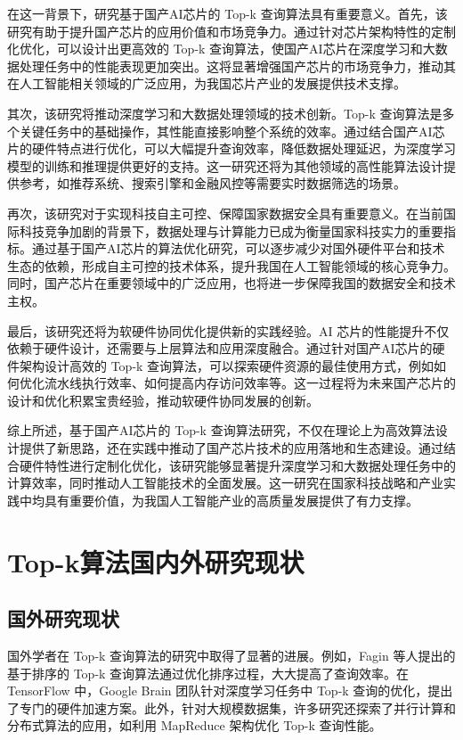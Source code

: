 在这一背景下，研究基于国产AI芯片的 Top-k 查询算法具有重要意义。首先，该研究有助于提升国产芯片的应用价值和市场竞争力。通过针对芯片架构特性的定制化优化，可以设计出更高效的 Top-k 查询算法，使国产AI芯片在深度学习和大数据处理任务中的性能表现更加突出。这将显著增强国产芯片的市场竞争力，推动其在人工智能相关领域的广泛应用，为我国芯片产业的发展提供技术支撑。

其次，该研究将推动深度学习和大数据处理领域的技术创新。Top-k 查询算法是多个关键任务中的基础操作，其性能直接影响整个系统的效率。通过结合国产AI芯片的硬件特点进行优化，可以大幅提升查询效率，降低数据处理延迟，为深度学习模型的训练和推理提供更好的支持。这一研究还将为其他领域的高性能算法设计提供参考，如推荐系统、搜索引擎和金融风控等需要实时数据筛选的场景。

再次，该研究对于实现科技自主可控、保障国家数据安全具有重要意义。在当前国际科技竞争加剧的背景下，数据处理与计算能力已成为衡量国家科技实力的重要指标。通过基于国产AI芯片的算法优化研究，可以逐步减少对国外硬件平台和技术生态的依赖，形成自主可控的技术体系，提升我国在人工智能领域的核心竞争力。同时，国产芯片在重要领域中的广泛应用，也将进一步保障我国的数据安全和技术主权。

最后，该研究还将为软硬件协同优化提供新的实践经验。AI 芯片的性能提升不仅依赖于硬件设计，还需要与上层算法和应用深度融合。通过针对国产AI芯片的硬件架构设计高效的 Top-k 查询算法，可以探索硬件资源的最佳使用方式，例如如何优化流水线执行效率、如何提高内存访问效率等。这一过程将为未来国产芯片的设计和优化积累宝贵经验，推动软硬件协同发展的创新。

综上所述，基于国产AI芯片的 Top-k 查询算法研究，不仅在理论上为高效算法设计提供了新思路，还在实践中推动了国产芯片技术的应用落地和生态建设。通过结合硬件特性进行定制化优化，该研究能够显著提升深度学习和大数据处理任务中的计算效率，同时推动人工智能技术的全面发展。这一研究在国家科技战略和产业实践中均具有重要价值，为我国人工智能产业的高质量发展提供了有力支撑。

\section{Top-k算法国内外研究现状}
\subsection{国外研究现状}
国外学者在 Top-k 查询算法的研究中取得了显著的进展。例如，Fagin 等人提出的基于排序的 Top-k 查询算法通过优化排序过程，大大提高了查询效率\cite{fagin2001efficient}。在 TensorFlow 中，Google Brain 团队针对深度学习任务中 Top-k 查询的优化，提出了专门的硬件加速方案\cite{google2021tf}。此外，针对大规模数据集，许多研究还探索了并行计算和分布式算法的应用，如利用 MapReduce 架构优化 Top-k 查询性能\cite{mapreduce2014}。

